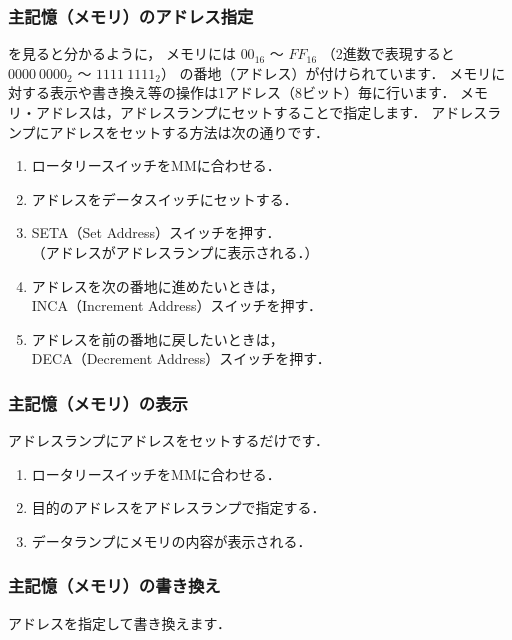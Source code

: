 \subsubsection{主記憶（メモリ）のアドレス指定}
を見ると分かるように，
メモリには $00_{16}$ 〜 $FF_{16}$
（2進数で表現すると $0000~0000_{2}$ 〜 $1111~1111_{2}$）
の番地（アドレス）が付けられています．
メモリに対する表示や書き換え等の操作は1アドレス（8ビット）毎に行います．
メモリ・アドレスは，アドレスランプにセットすることで指定します．
アドレスランプにアドレスをセットする方法は次の通りです．

\begin{enumerate}
\item ロータリースイッチをMMに合わせる．
\item アドレスをデータスイッチにセットする．
\item SETA（Set Address）スイッチを押す．\\
  （アドレスがアドレスランプに表示される．）
\item アドレスを次の番地に進めたいときは，\\
  INCA（Increment Address）スイッチを押す．
\item アドレスを前の番地に戻したいときは，\\
  DECA（Decrement Address）スイッチを押す．
\end{enumerate}

\subsubsection{主記憶（メモリ）の表示}
アドレスランプにアドレスをセットするだけです．

\begin{enumerate}
\item ロータリースイッチをMMに合わせる．
\item 目的のアドレスをアドレスランプで指定する．
\item データランプにメモリの内容が表示される．
\end{enumerate}

\subsubsection{主記憶（メモリ）の書き換え}
アドレスを指定して書き換えます．

